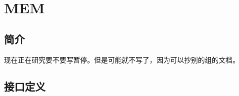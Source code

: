 \documentclass{article}
\begin{document}
\FloatBarrier

\section{MEM\label{sec:MEM}}

\subsection{简介}

现在正在研究要不要写暂停。但是可能就不写了，因为可以抄别的组的文档。

\FloatBarrier
\subsection{接口定义}
\begin{center}




    \tablelasttail{\bottomrule}

    \small
    \begin{supertabular}{llllp{3.5cm}p{3cm}}


\end{supertabular}
\end{center}
\end{document}
